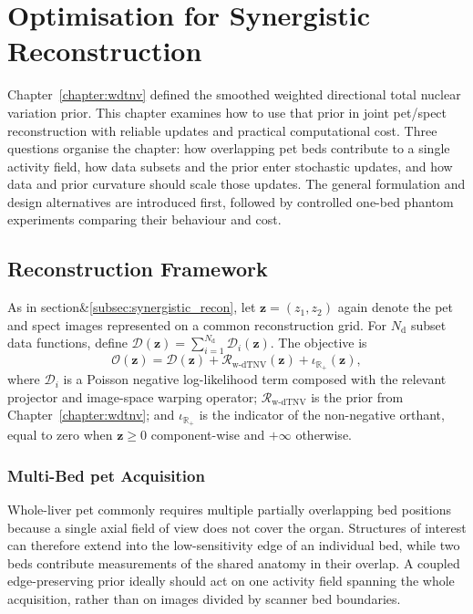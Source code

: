 \chapter{Optimisation for Synergistic Reconstruction}
\label{chapter:optimisation}

Chapter~\ref{chapter:wdtnv} defined the smoothed weighted directional total nuclear variation prior. This chapter examines how to use that prior in joint \gls{pet}/\gls{spect} reconstruction with reliable updates and practical computational cost. Three questions organise the chapter: how overlapping \gls{pet} beds contribute to a single activity field, how data subsets and the prior enter stochastic updates, and how data and prior curvature should scale those updates. The general formulation and design alternatives are introduced first, followed by controlled one-bed phantom experiments comparing their behaviour and cost.

\section{Reconstruction Framework}
\label{sec:optimisation_framework}

As in section&\ref{subsec:synergistic_recon}, let $\bm z=(z_1,z_2)$ again denote the \gls{pet} and \gls{spect} images represented on a common reconstruction grid. For $N_{\mathrm d}$ subset data functions, define $\mathcal D(\bm z)=\sum_{i=1}^{N_{\mathrm d}}\mathcal D_i(\bm z)$. The objective is
\begin{equation}
    \mathcal{O}(\bm z)
    =
    \mathcal D(\bm z)
    +
    \mathcal{R}_{\mathrm{w\text{-}dTNV}}(\bm z)
    +
    \iota_{\mathbb{R}_+}(\bm z),
    \label{eq:optimisation_objective}
\end{equation}
where $\mathcal{D}_i$ is a Poisson negative log-likelihood term composed with the relevant projector and image-space warping operator; $\mathcal{R}_{\mathrm{w\text{-}dTNV}}$ is the prior from Chapter~\ref{chapter:wdtnv}; and $\iota_{\mathbb{R}_+}$ is the indicator of the non-negative orthant, equal to zero when $\bm z\geq 0$ component-wise and $+\infty$ otherwise.

\subsection{Multi-Bed \gls{pet} Acquisition}
\label{sec:multibed}

Whole-liver \gls{pet} commonly requires multiple partially overlapping bed positions because a single axial field of view does not cover the organ. Structures of interest can therefore extend into the low-sensitivity edge of an individual bed, while two beds contribute measurements of the shared anatomy in their overlap. A coupled edge-preserving prior ideally should act on one activity field spanning the whole acquisition, rather than on images divided by scanner bed boundaries.

